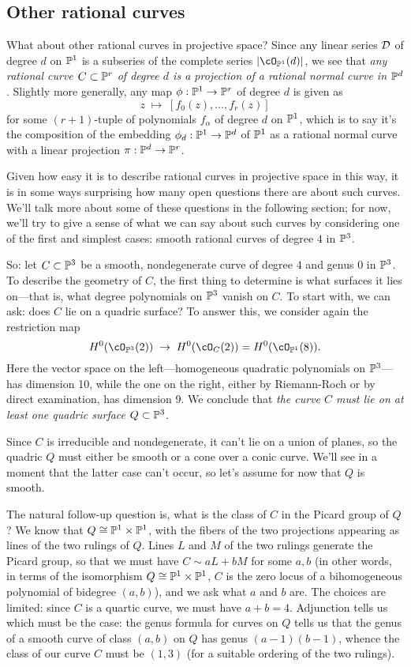\subsection{Other rational curves}

What about other rational curves in projective space? Since any linear series $\cD$ of degree $d$ on $\PP^1$ is a subseries of the complete series $|\cO_{\PP^1}(d)|$, we see that \emph{any rational curve $C \subset \PP^r$ of degree $d$ is a projection of a rational normal curve in $\PP^d$}. Slightly more generally, any map $\phi : \PP^1 \to \PP^r$ of degree $d$ is given as
$$
z \; \mapsto \; [f_0(z), \dots, f_r(z)]
$$
for some $(r+1)$-tuple of polynomials $f_\alpha$ of degree $d$ on $\PP^1$, which is to say it's the composition of the embedding $\phi_d : \PP^1 \to \PP^d$ of $\PP^1$ as a rational normal curve with a linear projection $\pi : \PP^d \to \PP^r$. 

Given how easy it is to describe rational curves in projective space in this way, it is in some ways surprising how many open questions there are about such curves. We'll talk more about some of these questions in the following section; for now, we'll try to give a sense of what we can say about such curves by considering one of the first and simplest cases: smooth rational curves of degree $4$ in $\PP^3$.

So: let $C \subset \PP^3$ be a smooth, nondegenerate curve of degree 4 and genus 0 in $\PP^3$. To describe the geometry of $C$, the first thing to determine is what surfaces it lies on---that is, what degree polynomials on $\PP^3$ vanish on $C$. To start with, we can ask: does $C$ lie on a quadric surface? To answer this, we consider again the restriction map
$$
H^0(\cO_{\PP^3}(2)) \; \to \; H^0(\cO_{C}(2)) = H^0(\cO_{\PP^1}(8)).
$$
Here the vector space on the left---homogeneous quadratic polynomials on $\PP^3$---has dimension 10, while the one on the right, either by Riemann-Roch or by direct examination, has dimension 9. We conclude that \emph{the curve $C$ must lie on at least one quadric surface $Q \subset \PP^3$}.

Since $C$ is irreducible and nondegenerate, it can't lie on a union of planes, so the quadric $Q$ must either be smooth or a cone over a conic curve. We'll see in a moment that the latter case can't occur, so let's assume for now that $Q$ is smooth. 

The natural follow-up question is, what is the class of $C$ in the Picard group of $Q$? We know that $Q \cong \PP^1 \times \PP^1$, with the fibers of the two projections appearing as lines of the two rulings of $Q$. Lines $L$ and $M$ of the two rulings generate the Picard group, so that we must have $C \sim aL + bM$ for some $a, b$ (in other words, in terms of the isomorphism $Q \cong \PP^1 \times \PP^1$, $C$ is the zero locus of a bihomogeneous polynomial of bidegree $(a,b)$), and we ask what $a$ and $b$ are. The choices are limited: since $C$ is a quartic curve, we must have $a+b = 4$. Adjunction tells us which must be the case: the genus formula for curves on $Q$ tells us that the genus of a smooth curve of class $(a,b)$ on $Q$ has genus $(a-1)(b-1)$, whence the class of our curve $C$ must be $(1,3)$ (for a suitable ordering of the two rulings).

